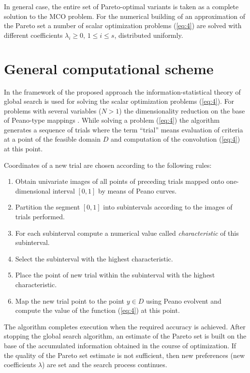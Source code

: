 \documentclass[runningheads]{llncs}
\begin{document}
In general case, the entire set of Pareto-optimal variants is taken as a complete solution to the MCO problem. For the numerical building of an approximation of the Pareto set a number of scalar optimization problems (\ref{eq:4}) are solved with different coefficients $\lambda_i \geq 0$, $1 \leq i \leq s$, distributed uniformly.

\section{General computational scheme}

In the framework of the proposed approach the information-statistical theory of global search is used for solving the scalar optimization problems (\ref{eq:4}). For problems with several variables ($N>1$) the dimensionality reduction on the base of Peano-type mappings \cite{Sergeyev2013,Strongin2000}. While solving a problem (\ref{eq:4}) the algorithm generates a sequence of trials where the term ``trial'' means evaluation of criteria at a point of the feasible domain $D$ and computation of the convolution (\ref{eq:4}) at this point. 

Coordinates of a new trial are chosen according to the following rules: 

\begin{enumerate}
  \item Obtain univariate images of all points of preceding trials mapped onto one-dimensional interval $[0,1]$ by means of Peano curves.
  \item Partition the segment $[0,1]$ into subintervals according to the images of trials performed.
  \item For each subinterval compute a numerical value called \textit{characteristic} of this subinterval.
  \item Select the subinterval with the highest characteristic.
  \item Place the point of new trial within the subinterval with the highest characteristic. 
  \item Map the new trial point to the point $y \in D$ using Peano evolvent and compute the value of the function (\ref{eq:4}) at this point. 
\end{enumerate}

The algorithm completes execution when the required accuracy is achieved. After stopping the global search algorithm, an estimate of the Pareto set is built on the base of the accumulated information obtained in the course of optimization. If the quality of the Pareto set estimate is not sufficient, then new preferences (new coefficients $\lambda$) are set and the search process continues.
\end{document}
